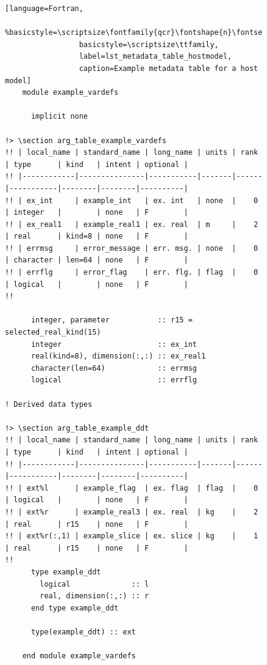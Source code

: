 \begin{figure}
\begin{lstlisting}[language=Fortran,
                 %basicstyle=\scriptsize\fontfamily{qcr}\fontshape{n}\fontseries{l}\selectfont
                 basicstyle=\scriptsize\ttfamily,
                 label=lst_metadata_table_hostmodel,
                 caption=Example metadata table for a host model]
    module example_vardefs

      implicit none

!> \section arg_table_example_vardefs
!! | local_name | standard_name | long_name | units | rank | type      | kind   | intent | optional |
!! |------------|---------------|-----------|-------|------|-----------|--------|--------|----------|
!! | ex_int     | example_int   | ex. int   | none  |    0 | integer   |        | none   | F        |
!! | ex_real1   | example_real1 | ex. real  | m     |    2 | real      | kind=8 | none   | F        |
!! | errmsg     | error_message | err. msg. | none  |    0 | character | len=64 | none   | F        |
!! | errflg     | error_flag    | err. flg. | flag  |    0 | logical   |        | none   | F        |
!!

      integer, parameter           :: r15 = selected_real_kind(15) 
      integer                      :: ex_int
      real(kind=8), dimension(:,:) :: ex_real1
      character(len=64)            :: errmsg
      logical                      :: errflg

! Derived data types

!> \section arg_table_example_ddt
!! | local_name | standard_name | long_name | units | rank | type      | kind   | intent | optional |
!! |------------|---------------|-----------|-------|------|-----------|--------|--------|----------|
!! | ext%l      | example_flag  | ex. flag  | flag  |    0 | logical   |        | none   | F        |
!! | ext%r      | example_real3 | ex. real  | kg    |    2 | real      | r15    | none   | F        |
!! | ext%r(:,1) | example_slice | ex. slice | kg    |    1 | real      | r15    | none   | F        |
!!
      type example_ddt
        logical              :: l
        real, dimension(:,:) :: r
      end type example_ddt

      type(example_ddt) :: ext

    end module example_vardefs
\end{lstlisting}
\end{figure}

